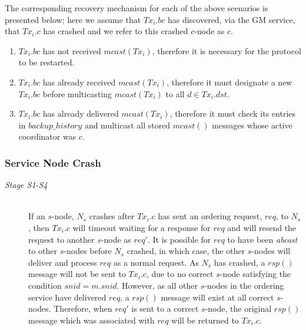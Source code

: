 \begin{description}
                The corresponding recovery mechanism for each of the above scenarios is presented below; here we assume that $Tx_i.bc$ has discovered, via the GM service, that $Tx_i.c$ has crashed and we refer to this crashed $c$-node as $c$.  
                \begin{enumerate}[label=\roman*]
                    \item    $Tx_i.bc$ has not received $mcast(Tx_i)$, therefore it is necessary for the protocol to be restarted.  
                    
                    \item    $Tx_i.bc$ has already received $mcast(Tx_i)$, therefore it must designate a new $Tx_i.bc$ before multicasting $mcast(Tx_i)$ to all $d \in Tx_i.dst$.  
                    
                    \item    $Tx_i.bc$ has already delivered $mcast(Tx_i)$, therefore it must check its entries in $backup\_history$ and multicast all stored $mcast()$ messages whose active coordinator was $c$.    
                \end{enumerate} 
    \end{description}
    
	\subsubsection*{Service Node Crash}
	\begin{description}
       \item[\emph{Stage S1-S4}] \hfill \\
       If an $s$-node, $N_s$ crashes after $Tx_i.c$ has sent an ordering request, $req$, to $N_s$, then $Tx_i.c$ will timeout waiting for a response for $req$ and will resend the request to another $s$-node as $req'$.    It is possible for $req$ to have been \emph{abcast} to other $s$-nodes before $N_s$ crashed, in which case, the other $s$-nodes will deliver and process $req$ as a normal request.  As $N_s$ has crashed, a $rsp()$ message will not be sent to $Tx_i.c$, due to no correct $s$-node satisfying the condition $snid = m.snid$.  However, as all other $s$-nodes in the ordering service have delivered $req$, a $rsp()$ message will exist at all correct $s$-nodes.  Therefore, when $req'$ is sent to a correct $s$-node, the original $rsp()$ message which was associated with $req$ will be returned to $Tx_i.c$.  
    \end{description}
    
